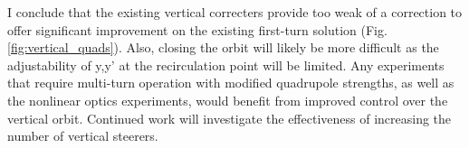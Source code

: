 I conclude that the existing vertical correcters provide too weak of a correction to offer significant improvement on the existing first-turn solution (Fig. \ref{fig:vertical_quads}). Also, closing the orbit will likely be more difficult as the adjustability of y,y' at the recirculation point will be limited. Any experiments that require multi-turn operation with modified quadrupole strengths, as well as the nonlinear optics experiments, would benefit from improved control over the vertical orbit. Continued work will investigate the effectiveness of increasing the number of vertical steerers. 


\begin{figure}[h]
\centering
{}
\hspace{0.5in}
\hspace{0.5in}
\end{figure}





















